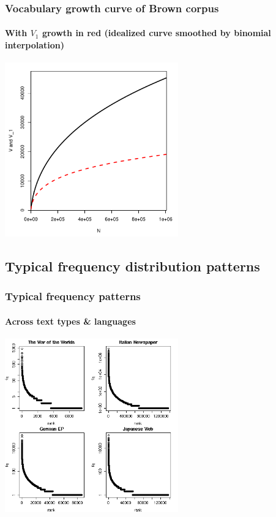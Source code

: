 \documentclass[t]{beamer} %
\begin{document}
\begin{frame}
  \frametitle{Vocabulary growth curve of Brown corpus}
  \framesubtitle{With $V_1$ growth in red (idealized curve smoothed by binomial interpolation)}

  \ungap[1.5]
  \begin{center}
    \includegraphics[height=7.5cm]{img/brown-vgc}
  \end{center}
\end{frame}

\subsection{Typical frequency distribution patterns}

\begin{frame}
  \frametitle{Typical frequency patterns} 
  \framesubtitle{Across text types \& languages}

  \ungap[1.5]
  \begin{center}
    \includegraphics[height=7.5cm]{img/othercorporarf}
  \end{center}
\end{frame}
\end{document}
